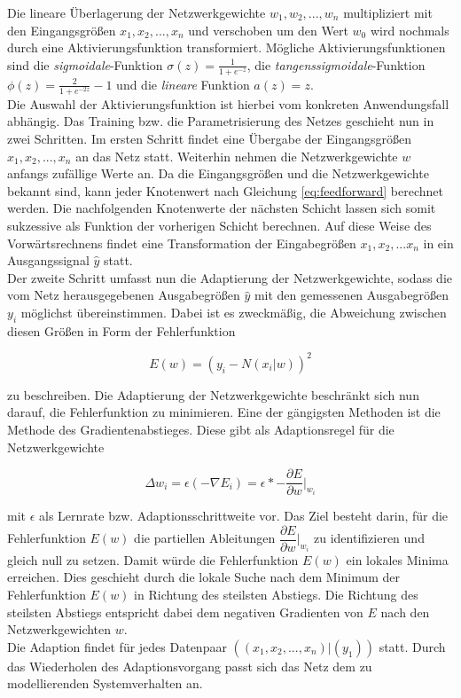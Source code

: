 Die lineare Überlagerung der Netzwerkgewichte $w_1,w_2,...,w_n$ multipliziert mit den Eingangsgrößen $x_1,x_2,...,x_n$ und verschoben um den Wert $w_0$ wird nochmals durch eine Aktivierungsfunktion transformiert. Mögliche Aktivierungsfunktionen sind die \textit{sigmoidale}-Funktion $\sigma(z) = \frac{1}{1 + e^{-z}}$, die \textit{tangenssigmoidale}-Funktion $\phi(z)=\frac{2}{1 + e^{-2z}}-1$ und die \textit{lineare} Funktion $a(z)=z$. \\ 
Die Auswahl der Aktivierungsfunktion ist hierbei vom konkreten Anwendungsfall abhängig. Das Training bzw. die Parametrisierung des Netzes geschieht nun in zwei Schritten. Im ersten Schritt findet eine Übergabe der Eingangsgrößen $x_1,x_2,...,x_n$ an das Netz statt. Weiterhin nehmen die Netzwerkgewichte $w$ anfangs zufällige Werte an. Da die Eingangsgrößen und die Netzwerkgewichte bekannt sind, kann jeder Knotenwert nach Gleichung \ref{eq:feedforward} berechnet werden. Die nachfolgenden Knotenwerte der nächsten Schicht lassen sich somit sukzessive als Funktion der vorherigen Schicht berechnen. Auf diese Weise des Vorwärtsrechnens findet eine Transformation der Eingabegrößen $x_1,x_2,...x_n$ in ein Ausgangssignal $\hat{y}$ statt. \\
Der zweite Schritt umfasst nun die Adaptierung der Netzwerkgewichte, sodass die vom Netz herausgegebenen Ausgabegrößen $\hat{y}$ mit den gemessenen Ausgabegrößen $y_i$ möglichst übereinstimmen. Dabei ist es zweckmäßig, die Abweichung zwischen diesen Größen in Form der Fehlerfunktion 

\begin{equation}
E(w) = (y_i-N(x_i|w))^{2}
\end{equation}

zu beschreiben. Die Adaptierung der Netzwerkgewichte beschränkt sich nun darauf, die Fehlerfunktion zu minimieren. Eine der gängigsten Methoden ist die Methode des Gradientenabstieges. Diese gibt als Adaptionsregel für die Netzwerkgewichte 

\begin{equation}
\label{eq:weight_adapt}
\Delta w_i = \epsilon  (-\nabla E_i) = \epsilon * - \dfrac{\partial E}{\partial w}\bigg|_{w_i}
\end{equation}

mit $\epsilon$ als Lernrate bzw. Adaptionsschrittweite vor. Das Ziel besteht darin, für die Fehlerfunktion $E(w)$ die partiellen Ableitungen $\dfrac{\partial E}{\partial w}\bigg|_{w_i}$ zu identifizieren und gleich null zu setzen. Damit würde die Fehlerfunktion $E(w)$ ein lokales Minima erreichen. Dies geschieht durch die lokale Suche nach dem Minimum der Fehlerfunktion $E(w)$ in Richtung des steilsten Abstiegs. Die Richtung des steilsten Abstiegs entspricht dabei dem negativen Gradienten von $E$ nach den Netzwerkgewichten $w$.\\ 
Die Adaption findet für jedes Datenpaar $((x_1,x_2,...,x_n)|(y_1))$ statt. Durch das Wiederholen des Adaptionsvorgang passt sich das Netz dem zu modellierenden Systemverhalten an. \\

